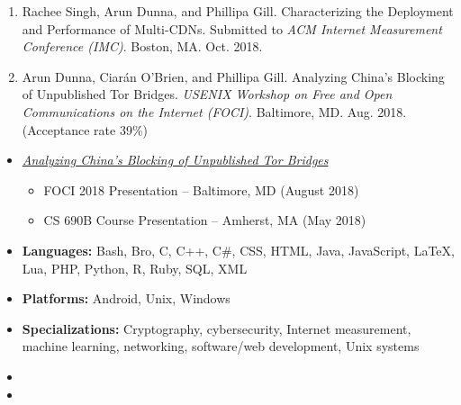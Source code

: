 
\begin{enumerate}
 \item Rachee Singh, Arun Dunna, and Phillipa Gill. Characterizing the Deployment and Performance of Multi-CDNs. Submitted to \textit{ACM Internet Measurement Conference (IMC)}. Boston, MA. Oct. 2018.
 \item Arun Dunna, Ciar\'an O'Brien, and Phillipa Gill. Analyzing China's Blocking of Unpublished Tor Bridges. \textit{USENIX Workshop on Free and Open Communications on the Internet (FOCI)}. Baltimore, MD. Aug. 2018. (Acceptance rate 39\%)
\end{enumerate}


\begin{itemize}
\item
    {\it \href{https://adunna.me/foci-2018-tor/}{Analyzing China's Blocking of Unpublished Tor Bridges}}
    \begin{itemize}
        \item FOCI 2018 Presentation -- Baltimore, MD (August 2018)
        \item CS 690B Course Presentation -- Amherst, MA (May 2018)
    \end{itemize}

\end{itemize}

\newpage


\begin{itemize}
\item \textbf{Languages:} Bash, Bro, C, C++, C\#, CSS, HTML, Java, JavaScript, LaTeX, Lua, PHP, Python, R, Ruby, SQL, XML
    \item \textbf{Platforms:}
Android, Unix, Windows
        \item \textbf{Specializations:}
    Cryptography, cybersecurity, Internet measurement, machine learning, networking, software/web development, Unix systems

\end{itemize}


\begin{itemize}
\item
\item
\end{itemize}


